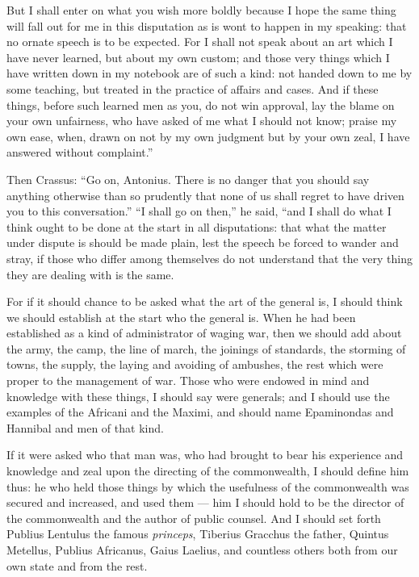  But I shall enter on what you wish more boldly because I hope the same thing will fall out for me in this disputation as is wont to happen in my speaking: that no ornate speech is to be expected. For I shall not speak about an art which I have never learned, but about my own custom; and those very things which I have written down in my notebook are of such a kind: not handed down to me by some teaching, but treated in the practice of affairs and cases. And if these things, before such learned men as you, do not win approval, lay the blame on your own unfairness, who have asked of me what I should not know; praise my own ease, when, drawn on not by my own judgment but by your own zeal, I have answered without complaint.''

 Then Crassus: ``Go on, Antonius. There is no danger that you should say anything otherwise than so prudently that none of us shall regret to have driven you to this conversation.'' ``I shall go on then,'' he said, ``and I shall do what I think ought to be done at the start in all disputations: that what the matter under dispute is should be made plain, lest the speech be forced to wander and stray, if those who differ among themselves do not understand that the very thing they are dealing with is the same.

 For if it should chance to be asked what the art of the general is, I should think we should establish at the start who the general is. When he had been established as a kind of administrator of waging war, then we should add about the army, the camp, the line of march, the joinings of standards, the storming of towns, the supply, the laying and avoiding of ambushes, the rest which were proper to the management of war. Those who were endowed in mind and knowledge with these things, I should say were generals; and I should use the examples of the Africani and the Maximi, and should name Epaminondas and Hannibal and men of that kind.

 If it were asked who that man was, who had brought to bear his experience and knowledge and zeal upon the directing of the commonwealth, I should define him thus: he who held those things by which the usefulness of the commonwealth was secured and increased, and used them — him I should hold to be the director of the commonwealth and the author of public counsel. And I should set forth Publius Lentulus the famous \textit{princeps}, Tiberius Gracchus the father, Quintus Metellus, Publius Africanus, Gaius Laelius, and countless others both from our own state and from the rest.

